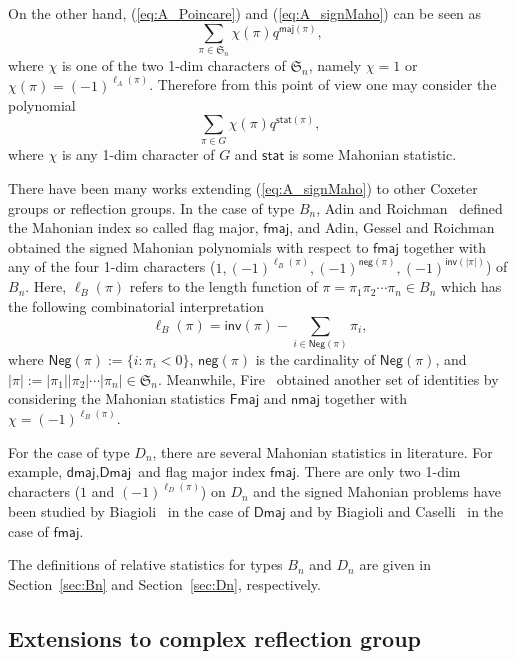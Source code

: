 \documentclass[a4paper, reqno, 11pt]{amsart}
\newcommand{\stat}{{\textsf{stat}}}
\newcommand{\maj}{{\textsf{maj}}}
\newcommand{\inv}{{\textsf{inv}}}
\newcommand{\Nega}{{\textsf{Neg}}}
\newcommand{\nega}{{\textsf{neg}}}
\newcommand{\fmaj}{{\textsf{fmaj}}}
\newcommand{\Fmaj}{{\textsf{Fmaj}}}
\newcommand{\nmaj}{{\textsf{nmaj}}}
\newcommand{\Dmaj}{{\textsf{Dmaj}}}
\newcommand{\dmaj}{{\textsf{dmaj}}}
\numberwithin{equation}{section}
\begin{document}
On the other hand, (\ref{eq:A_Poincare}) and (\ref{eq:A_signMaho})
can be seen as
$$\sum_{\pi\in \mathfrak{S}_n} \chi(\pi) q^{\maj(\pi)},$$
where $\chi$ is one of the two 1-dim characters of $\mathfrak{S}_n$, namely $\chi=1$ or $\chi(\pi)=(-1)^{\ell_A(\pi)}$. 
Therefore from this point of view one may consider the polynomial
\begin{equation}
\sum_{\pi\in G} \chi({\pi}) q^{\stat({\pi})},
\end{equation}
where $\chi$ is any 1-dim character of $G$ and $\stat$ is some Mahonian statistic.

There have been many works extending (\ref{eq:A_signMaho}) to other Coxeter groups or reflection groups. 
In the case of type $B_n$, Adin and Roichman~\cite{Adin_Roichman_01} defined the Mahonian index so called flag major, $\fmaj$, and Adin, Gessel and Roichman~\cite{Adin_Gessel_Roichman_05} obtained the signed Mahonian polynomials with respect to $\fmaj$ together with any of the four 1-dim characters ($1, (-1)^{\ell_B(\pi)}, (-1)^{\nega(\pi)}, (-1)^{\inv(|\pi|)}$) of $B_n$.
Here, $\ell_B(\pi)$ refers to the length function of $\pi=\pi_1\pi_2\cdots\pi_n\in B_n$ which has the following combinatorial interpretation
\begin{equation}\label{eq:length_Bn}
\ell_B(\pi)=\inv(\pi)-\sum_{i\in\Nega(\pi)}\pi_i,
\end{equation}
where $\Nega(\pi):=\{i: \pi_i<0\}$, $\nega(\pi)$ is the cardinality of $\Nega(\pi)$, and $|\pi|:=|\pi_1||\pi_2|\cdots|\pi_n|\in \mathfrak{S}_n$.
Meanwhile, Fire~\cite{Fire_08} obtained another set of identities by considering the Mahonian statistics $\Fmaj$ and $\nmaj$ together with $\chi=(-1)^{\ell_B(\pi)}$.

For the case of type $D_n$, there are several Mahonian statistics in literature. 
For example, $\dmaj, \Dmaj$ and flag major index $\fmaj$. 
There are only two 1-dim characters ($1$ and $(-1)^{\ell_D(\pi)}$) on $D_n$ and the signed Mahonian problems have been studied by Biagioli~\cite{Biagioli_06} in the case of $\Dmaj$ and by Biagioli
and Caselli~\cite{Biagioli_Caselli_12} in the case of $\fmaj$.

The definitions of relative statistics for types $B_n$ and $D_n$ are given in Section~\ref{sec:Bn} and Section~\ref{sec:Dn}, respectively.


\subsection{Extensions to complex reflection group}
\end{document}
